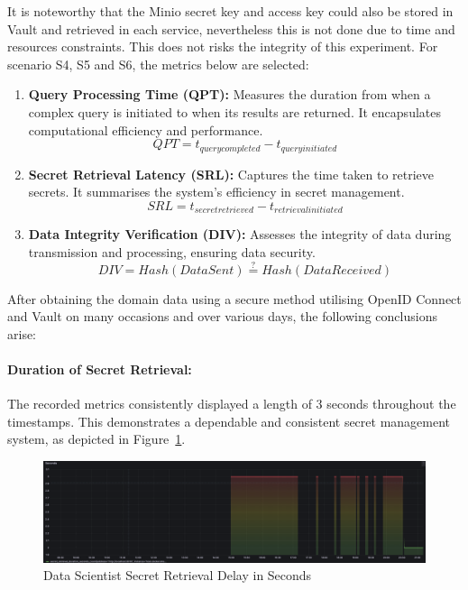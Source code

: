 \documentclass[journal]{IEEEtran}
\begin{document}
It is noteworthy that the Minio secret key and access key could also be stored in Vault and retrieved in each service, nevertheless this is not done due to time and resources constraints. This does not risks the integrity of this experiment. For scenario S4, S5 and S6, the metrics below are selected: 

\begin{enumerate}
  \item \textbf{Query Processing Time (QPT):} Measures the duration from when a complex query is initiated to when its results are returned. It encapsulates computational efficiency and performance.
  \begin{equation}
      QPT = t_{query completed} - t_{query initiated}
  \end{equation}

  \item \textbf{Secret Retrieval Latency (SRL):} Captures the time taken to retrieve secrets. It summarises the system's efficiency in secret management.
  \begin{equation}
      SRL = t_{secret retrieved} - t_{retrieval initiated}
  \end{equation}

  \item \textbf{Data Integrity Verification (DIV):} Assesses the integrity of data during transmission and processing, ensuring data security.
  \begin{equation}
      DIV = Hash(Data Sent) \stackrel{?}{=} Hash(Data Received)
  \end{equation}

\end{enumerate}

After obtaining the domain data using a secure method utilising OpenID Connect and Vault on many occasions and over various days, the following conclusions arise:

\paragraph{Duration of Secret Retrieval:}
The recorded metrics consistently displayed a length of 3 seconds throughout the timestamps. This demonstrates a dependable and consistent secret management system, as depicted in Figure~\ref{dataScientistSecretRetrievalDelayInSeconds}.

\begin{figure}[h]
  \centering
  \includegraphics[width=\textwidth]{images/Secret-Retrieval-Delay-in-Seconds-In-Data-Scientist-Application.png}
  \caption{Data Scientist Secret Retrieval Delay in Seconds }
  \label{dataScientistSecretRetrievalDelayInSeconds}
\end{figure}
\end{document}
